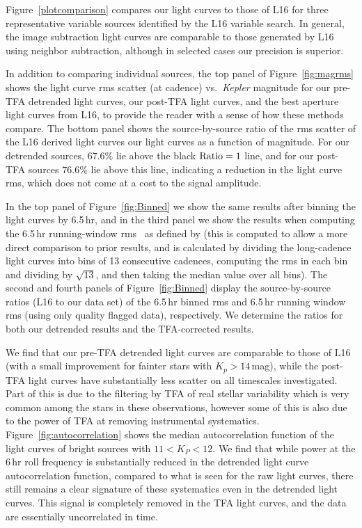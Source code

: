\documentclass[apjl]{emulateapj}
\begin{document}
Figure~\ref{plotcomparison} compares our light curves to those of L16
for three representative variable sources identified by the L16 variable
search. In general, the image subtraction light curves are comparable to
those generated by L16 using neighbor subtraction, although in selected
cases our precision is superior.

In addition to comparing individual sources, the top panel of
Figure~\ref{fig:magrms} shows the light curve rms scatter (at cadence)
vs.\ {\em Kepler} magnitude for our pre-TFA detrended light curves, our
post-TFA light curves, and the best aperture light curves from L16, to
provide the reader with a sense of how these methods compare.  The
bottom panel shows the source-by-source ratio of the rms scatter of the
L16 derived light curves our light curves as a function of magnitude.
For our detrended sources, $67.6\%$ lie above the black $\rm Ratio=1$
line, and for our post-TFA sources $76.6\%$ lie above this line,
indicating a reduction in the light curve rms, which does not come at a
cost to the signal amplitude.

In the top panel of Figure~\ref{fig:Binned} we show the same results
after binning the light curves by 6.5\,hr, and in the third panel we
show the results when computing the 6.5\,hr running-window rms \ as
defined by \citet{Vanderburg:2014} (this is computed to allow a more
direct comparison to prior results, and is calculated by dividing the
long-cadence light curves into bins of 13 consecutive cadences,
computing the rms in each bin and dividing by $\sqrt{13}$, and then
taking the median value over all bins). The second and fourth panels of
Figure~\ref{fig:Binned} display the source-by-source ratios (L16 to our
data set) of the 6.5\,hr binned rms and 6.5\,hr running window rms
(using only quality flagged data), respectively.  We determine the
ratios for both our detrended results and the TFA-corrected results.


We find that our pre-TFA detrended light curves are comparable to those
of L16 (with a small improvement for fainter stars with $K_{p} >
14$\,mag), while the post-TFA light curves have substantially less
scatter on all timescales investigated.  Part of this is due to the
filtering by TFA of real stellar variability which is very common among
the stars in these observations, however some of this is also due to the
power of TFA at removing instrumental
systematics. Figure~\ref{fig:autocorrelation} shows the median
autocorrelation function of the light curves of bright sources with $11
< K_{P} < 12$. We find that while power at the 6\,hr roll frequency is
substantially reduced in the detrended light curve autocorrelation
function, compared to what is seen for the raw light curves, there still
remains a clear signature of these systematics even in the detrended
light curves. This signal is completely removed in the TFA light curves,
and the data are essentially uncorrelated in time.
\end{document}
